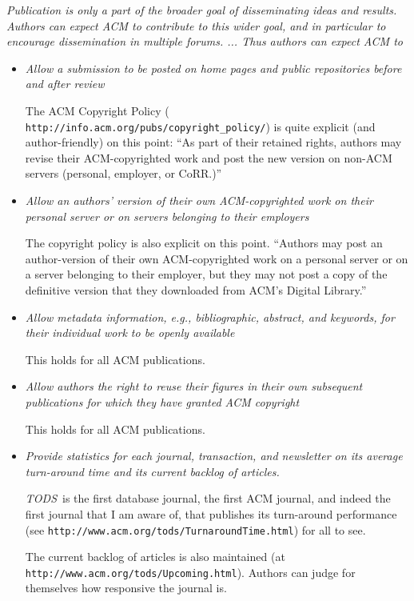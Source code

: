 \documentclass{article}
\newcommand{\tods}{{\em TODS\/}}
\begin{document}
\noindent
{\em Publication is only a part of the broader goal of disseminating ideas and
results.  Authors can expect ACM to contribute to this wider goal, and in
particular to encourage dissemination in multiple forums. ... Thus authors can
expect ACM to} 

\begin{itemize}
\item {\em Allow a submission to be posted on home pages and public
  repositories before and after review}

  The ACM Copyright Policy ({\tt
  http://info.acm.org/pubs/copyright\_policy/}) is quite explicit (and
  author-friendly) on this point: ``As part of their retained rights,
  authors may revise their ACM-copyrighted work and post the new version on
  non-ACM servers (personal, employer, or CoRR.)''

\item {\em Allow an authors' version of their own ACM-copyrighted work on
  their personal server or on servers belonging to their employers}

  The copyright policy is also explicit on this point. ``Authors may post an
  author-version of their own ACM-copyrighted work on a personal server or
  on a server belonging to their employer, but they may not post a copy of
  the definitive version that they downloaded from ACM's Digital
  Library.''

\item {\em Allow metadata information, e.g., bibliographic,
  abstract, and keywords, for their individual work to be openly available}

  This holds for all ACM publications.

\item {\em Allow authors the right to reuse their figures in their own
  subsequent publications for which they have granted ACM copyright}

  This holds for all ACM publications.

\item {\em Provide statistics for each journal, transaction, and newsletter
  on its average turn-around time and its current backlog of articles.}

  \tods\ is the first database journal, the first ACM journal, and indeed
  the first journal that I am aware of, that publishes its turn-around
  performance (see {\tt http://www.acm.org/tods/TurnaroundTime.html}) for
  all to see.

  The current backlog of articles is also maintained (at
  {\tt http://www.acm.org/tods/Upcoming.html}). Authors can judge for
  themselves how responsive the journal is.
\end{itemize}
\end{document}
